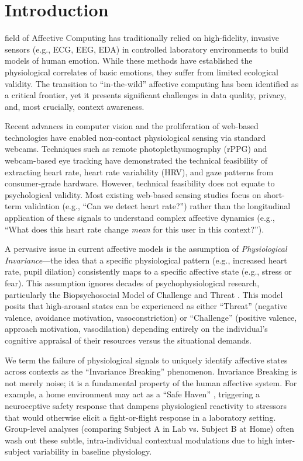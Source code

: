 \documentclass[journal]{IEEEtran}
\begin{document}
\section{Introduction}

 field of Affective Computing \cite{picard_affective_computing} has traditionally relied on high-fidelity, invasive sensors (e.g., ECG, EEG, EDA) in controlled laboratory environments to build models of human emotion. While these methods have established the physiological correlates of basic emotions, they suffer from limited ecological validity. The transition to ``in-the-wild'' affective computing \cite{ambulatory_assessment} has been identified as a critical frontier, yet it presents significant challenges in data quality, privacy, and, most crucially, context awareness.

Recent advances in computer vision and the proliferation of web-based technologies have enabled non-contact physiological sensing via standard webcams. Techniques such as remote photoplethysmography (rPPG) \cite{mcduff_rppg} and webcam-based eye tracking \cite{webgazer} have demonstrated the technical feasibility of extracting heart rate, heart rate variability (HRV), and gaze patterns from consumer-grade hardware. However, technical feasibility does not equate to psychological validity. Most existing web-based sensing studies focus on short-term validation (e.g., ``Can we detect heart rate?'') rather than the longitudinal application of these signals to understand complex affective dynamics (e.g., ``What does this heart rate change \textit{mean} for this user in this context?'').

A pervasive issue in current affective models is the assumption of \textit{Physiological Invariance}—the idea that a specific physiological pattern (e.g., increased heart rate, pupil dilation) consistently maps to a specific affective state (e.g., stress or fear). This assumption ignores decades of psychophysiological research, particularly the Biopsychosocial Model of Challenge and Threat \cite{biopsychosocial_model}. This model posits that high-arousal states can be experienced as either ``Threat'' (negative valence, avoidance motivation, vasoconstriction) or ``Challenge'' (positive valence, approach motivation, vasodilation) depending entirely on the individual's cognitive appraisal of their resources versus the situational demands.

We term the failure of physiological signals to uniquely identify affective states across contexts as the ``Invariance Breaking'' phenomenon. Invariance Breaking is not merely noise; it is a fundamental property of the human affective system. For example, a home environment may act as a ``Safe Haven'' \cite{polyvagal}, triggering a neuroceptive safety response that dampens physiological reactivity to stressors that would otherwise elicit a fight-or-flight response in a laboratory setting. Group-level analyses (comparing Subject A in Lab vs. Subject B at Home) often wash out these subtle, intra-individual contextual modulations due to high inter-subject variability in baseline physiology.
\end{document}
